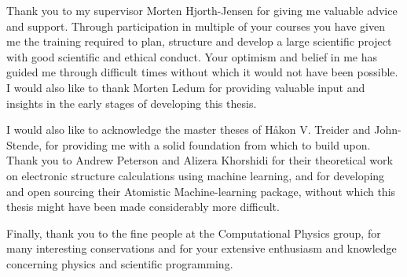 Thank you to my supervisor Morten Hjorth-Jensen for giving
me valuable advice and support. Through participation in multiple
of your courses you have given me the training required to plan,
structure and develop a large scientific project with good scientific
and ethical conduct. Your optimism and belief in me has guided
me through difficult times without which it would not have been possible.
I would also like to thank Morten Ledum for providing valuable input
and insights in the early stages of developing this thesis.
\par
I would also like to acknowledge the master theses of Håkon V. Treider
and John-Stende, for providing me with a solid foundation from which
to build upon. Thank you to Andrew Peterson and Alizera Khorshidi
for their theoretical work on electronic structure calculations
using machine learning, and for developing and open sourcing
their Atomistic Machine-learning package, without which this
thesis might have been made considerably more difficult.
\par
Finally, thank you to the fine people at the Computational Physics
group, for many interesting conservations and for your extensive
enthusiasm and knowledge concerning physics and scientific programming.
